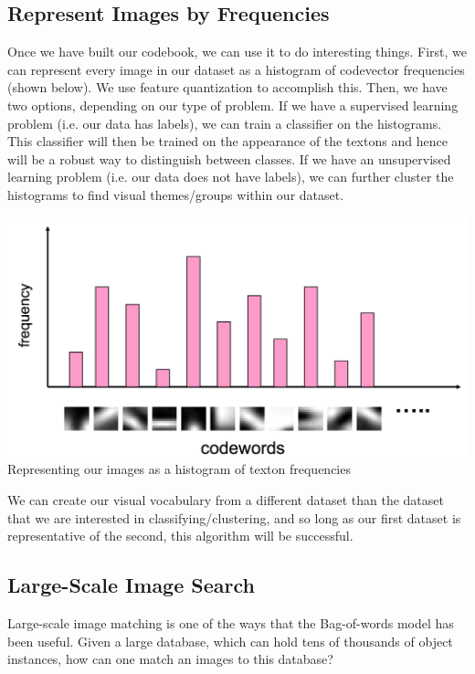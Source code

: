 \documentclass{article}
\begin{document}
\subsection{Represent Images by Frequencies}
Once we have built our codebook, we can use it to do interesting things. First, we can represent every image in our dataset as a histogram of codevector frequencies (shown below). We use feature quantization to accomplish this. Then, we have two options, depending on our type of problem. If we have a supervised learning problem (i.e. our data has labels), we can train a classifier on the histograms. This classifier will then be trained on the appearance of the textons and hence will be a robust way to distinguish between classes. If we have an unsupervised learning problem (i.e. our data does not have labels), we can further cluster the histograms to find visual themes/groups within our dataset. 
\begin{center}
\includegraphics[scale=0.4]{hist.png}\\
Representing our images as a histogram of texton frequencies \cite{slides}
\end{center}

We can create our visual vocabulary from a different dataset than the dataset that we are interested in classifying/clustering, and so long as our first dataset is representative of the second, this algorithm will be successful.

\subsection{Large-Scale Image Search}
Large-scale image matching is one of the ways that the Bag-of-words model has been useful. Given a large database, which can hold tens of thousands of object instances, how can one match an images to this database?
\end{document}
